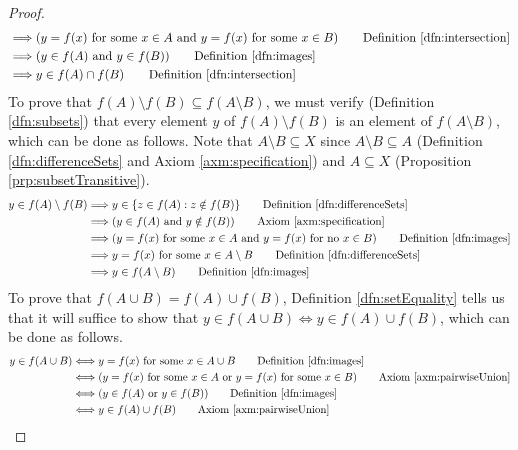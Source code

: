 \documentclass[../main.tex]{subfiles}
\begin{document}
\begin{enumerate}[ref={\thesection.\arabic*}]
\begin{proof}
\begin{align*}
            &\Longrightarrow (y=f(x)\text{ for some }x\in A\text{ and }y=f(x)\text{ for some }x\in B) \tag*{Definition \ref{dfn:intersection}}\\
            &\Longrightarrow (y\in f(A)\text{ and }y\in f(B)) \tag*{Definition \ref{dfn:images}}\\
            &\Longrightarrow y\in f(A)\cap f(B) \tag*{Definition \ref{dfn:intersection}}
        \end{align*}
        To prove that $f(A)\setminus f(B)\subseteq f(A\setminus B)$, we must verify (Definition \ref{dfn:subsets}) that every element $y$ of $f(A)\setminus f(B)$ is an element of $f(A\setminus B)$, which can be done as follows. Note that $A\setminus B\subseteq X$ since $A\setminus B\subseteq A$ (Definition \ref{dfn:differenceSets} and Axiom \ref{axm:specification}) and $A\subseteq X$ (Proposition \ref{prp:subsetTransitive}).
        \begin{align*}
            y\in f(A)\setminus f(B) &\Longrightarrow y\in\{z\in f(A):z\notin f(B)\} \tag*{Definition \ref{dfn:differenceSets}}\\
            &\Longrightarrow (y\in f(A)\text{ and }y\notin f(B)) \tag*{Axiom \ref{axm:specification}}\\
            &\Longrightarrow (y=f(x)\text{ for some }x\in A\text{ and }y=f(x)\text{ for no }x\in B) \tag*{Definition \ref{dfn:images}}\\
            &\Longrightarrow y=f(x)\text{ for some }x\in A\setminus B \tag*{Definition \ref{dfn:differenceSets}}\\
            &\Longrightarrow y\in f(A\setminus B) \tag*{Definition \ref{dfn:images}}
        \end{align*}
        To prove that $f(A\cup B)=f(A)\cup f(B)$, Definition \ref{dfn:setEquality} tells us that it will suffice to show that $y\in f(A\cup B) \Longleftrightarrow y\in f(A)\cup f(B)$, which can be done as follows.
        \begin{align*}
            y\in f(A\cup B) &\Longleftrightarrow y=f(x)\text{ for some }x\in A\cup B \tag*{Definition \ref{dfn:images}}\\
            &\Longleftrightarrow (y=f(x)\text{ for some }x\in A\text{ or }y=f(x)\text{ for some }x\in B) \tag*{Axiom \ref{axm:pairwiseUnion}}\\
            &\Longleftrightarrow (y\in f(A)\text{ or }y\in f(B)) \tag*{Definition \ref{dfn:images}}\\
            &\Longleftrightarrow y\in f(A)\cup f(B) \tag*{Axiom \ref{axm:pairwiseUnion}}

\end{align*}
\end{proof}
\end{enumerate}
\end{document}
